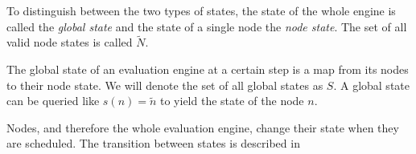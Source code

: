 To distinguish between the two types of states, the state of the whole engine is called the \emph{global state} and the state of a single node the \emph{node state}.
The set of all valid node states is called \(\widetilde{N}\).

The global state of an evaluation engine at a certain step is a map from its nodes to their node state.
We will denote the set of all global states as \(S\).
A global state can be queried like \(s(n) = \widetilde{n}\) to yield the state of the node \(n\).

Nodes, and therefore the whole evaluation engine, change their state when they are scheduled.
The transition between states is described in 



